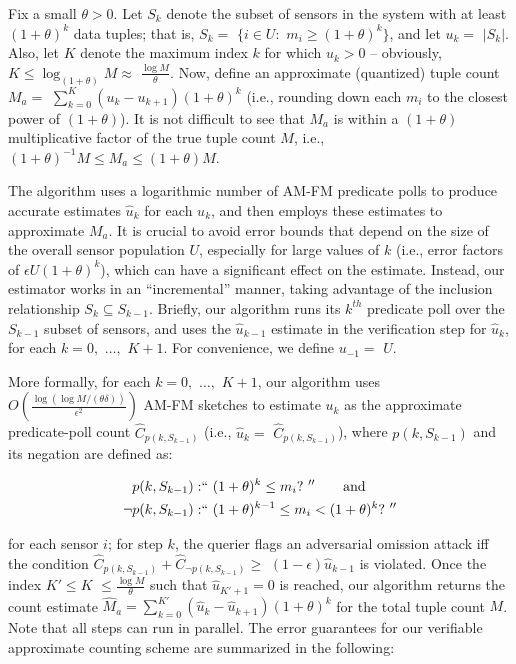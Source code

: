 \documentclass[10pt,twocolumn]{article}
\newcommand{\amfm}{AM-FM\xspace}
\newcommand{\estcpredk}{\ensuremath{\hat{C}_\mathit{p(k, S_{k-1})}}\xspace}
\newcommand{\estcnpredk}{\ensuremath{\hat{C}_{\neg\mathit{p(k, S_{k-1})}}}\xspace}
\begin{document}
Fix a small $\theta>0$.
Let $S_k$ denote the subset of sensors in the system 
with at least $(1+\theta)^k$ data tuples; that is,
$S_k=$ $\{i\in U:$ $m_i\geq (1+\theta)^k\}$,  and let  $u_k=$ $|S_k|$.
Also, let $K$ denote the maximum index $k$ for which $u_k>0$ -- obviously,
$K\leq \log_{(1+\theta)}M\approx$ $\frac{\log M}{\theta}$.
Now, define an approximate (quantized) tuple count 
$M_a=$ $\sum_{k=0}^{K}(u_k-u_{k+1})(1+\theta)^k$ (i.e., rounding down
each $m_i$ to the closest power of $(1+\theta)$).
It is not difficult to see that $M_a$ is within a $(1+\theta)$ multiplicative 
factor of the true tuple count $M$, i.e., $(1+\theta)^{-1} M\leq M_a\leq (1+\theta)M$.

The algorithm uses a logarithmic number of \amfm predicate 
polls  to produce accurate estimates $\hat{u}_k$ for each $u_k$,
and then employs these estimates to approximate $M_a$.
It is crucial to avoid error bounds that 
depend on the size of the overall sensor population $U$, especially for large 
values of $k$ (i.e., error factors of $\epsilon U (1+\theta)^k$), which can have 
a significant effect on the estimate.
Instead, our estimator works in an ``incremental'' manner,   
taking advantage of the inclusion relationship $S_{k}\subseteq S_{k-1}$.
Briefly, our algorithm runs its  $k^{th}$ predicate poll 
over the $S_{k-1}$ subset of sensors, and uses
the $\hat{u}_{k-1}$ estimate in the verification step for 
$\hat{u}_{k}$, for each $k=0,$ $\ldots,$ $K+1$.
For convenience, we define $u_{-1}=$ $U$.

More formally, for each $k=0,$ $\ldots,$ $K+1$, our algorithm uses 
$O(\frac{\log(\log M/(\theta\delta))}{\epsilon^2})$ \amfm sketches to estimate 
$u_k$ as the approximate predicate-poll count $\estcpredk$ (i.e., 
$\hat{u}_k =$ $\estcpredk$), where $p(k, S_{k-1})$  and 
its negation are defined as:

\vspace{-15pt}
{\small
\begin{eqnarray*}
p(k, S_{k-1}) : & ``\ (1+\theta)^k \leq m_i ?\ ''  \mbox{\hspace*{2em}and}\\
\neg p(k, S_{k-1}) : & ``\ (1+\theta)^{k-1}\leq m_i< (1+\theta)^k ?\ ''
\end{eqnarray*}
}

\vspace{-15pt}
\noindent for each sensor $i$; for step $k$, the querier flags an
adversarial omission attack iff the condition 
$\estcpredk+\estcnpredk\geq$ $(1-\epsilon)\hat{u}_{k-1}$ is violated.
Once the index $K'\leq K$ 
$\leq\frac{\log M}{\theta}$
such that $\hat{u}_{K'+1}=0$ is reached, our algorithm returns the count
estimate
$
\hat{M}_a = \sum_{k=0}^{K'} (\hat{u}_k-\hat{u}_{k+1}) (1+\theta)^k
$
for the total tuple count $M$. Note that all steps can run in parallel.
The error guarantees for our verifiable approximate counting scheme
are summarized in the following:
\end{document}
